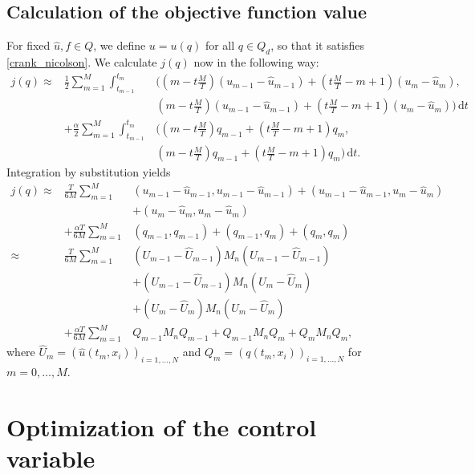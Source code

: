 \subsection{Calculation of the objective function value}
For fixed $\hat{u},f\in Q$, we define $u=u(q)$ for all $q\in Q_d$, so that it satisfies \eqref{crank_nicolson}. We calculate $j(q)$ now in the following way:
\begin{eqnarray*}
j(q) \approx& \frac{1}{2}\sum_{m=1}^M\int_{t_{m-1}}^{t_m}&\bigg(\left(m-t\frac{M}{T}\right) \left(u_{m-1}-\hat{u}_{m-1}\right)+\left(t\frac{M}{T}-m+1\right) \left(u_{m}-\hat{u}_{m}\right),\\
&&\left(m-t\frac{M}{T}\right) \left(u_{m-1}-\hat{u}_{m-1}\right)+\left(t\frac{M}{T}-m+1\right) \left(u_{m}-\hat{u}_{m}\right)\bigg)\,\mathrm{d}t\\
&+ \frac{\alpha}{2}\sum_{m=1}^M\int_{t_{m-1}}^{t_m}&\bigg(\left(m-t\frac{M}{T}\right) q_{m-1}+\left(t\frac{M}{T}-m+1\right) q_{m},\\
&&\left(m-t\frac{M}{T}\right) q_{m-1}+\left(t\frac{M}{T}-m+1\right) q_{m}\bigg)\,\mathrm{d}t.
\end{eqnarray*}
Integration by substitution yields
\begin{eqnarray*}
j(q) \approx& \frac{T}{6M}\sum_{m=1}^M&\left(u_{m-1}-\hat{u}_{m-1},u_{m-1}-\hat{u}_{m-1}\right) + \left(u_{m-1}-\hat{u}_{m-1},u_{m}-\hat{u}_{m}\right)\\
&&+ \left(u_{m}-\hat{u}_{m},u_{m}-\hat{u}_{m}\right)\\
&+ \frac{\alpha T}{6M}\sum_{m=1}^M&\left(q_{m-1},q_{m-1}\right) + \left(q_{m-1},q_{m}\right) + \left(q_{m},q_{m}\right)\\
\approx& \frac{T}{6M}\sum_{m=1}^M&\left(U_{m-1}-\hat{U}_{m-1}\right)M_n\left(U_{m-1}-\hat{U}_{m-1}\right)\\
&&+ \left(U_{m-1}-\hat{U}_{m-1}\right)M_n\left(U_{m}-\hat{U}_{m}\right)\\
&&+ \left(U_{m}-\hat{U}_{m}\right)M_n\left(U_{m}-\hat{U}_{m}\right)\\
&+ \frac{\alpha T}{6M}\sum_{m=1}^M&Q_{m-1}M_nQ_{m-1} + Q_{m-1}M_nQ_{m} + Q_{m}M_nQ_{m},
\end{eqnarray*}
where $\hat{U}_m=\left(\hat{u}(t_m, x_i)\right)_{i=1,\dotsc,N}$ and $Q_m=\left(q(t_m, x_i)\right)_{i=1,\dotsc,N}$ for $m=0,\dotsc,M$.

\section{Optimization of the control variable}


